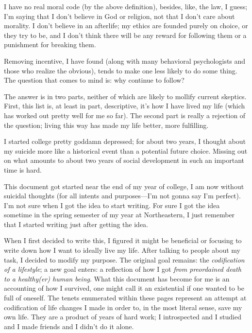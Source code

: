 \documentclass[./butidigress.tex]{subfiles}
\begin{document}
I have no real moral code (by the above definition), besides, like, the law, I guess; I'm saying that I don't believe in God or religion, not that I don't care about morality.
I don't believe in an afterlife; my ethics are founded purely on choice, or they try to be, and I don't think there will be any reward for following them or a punishment for breaking them.

Removing incentive, I have found (along with many behavioral psychologists and those who realize the obvious), tends to make one less likely to do some thing.
The question that comes to mind is: why continue to follow?

The answer is in two parts, neither of which are likely to mollify current skeptics.
First, this list is, at least in part, descriptive, it's how I have lived my life (which has worked out pretty well for me so far).
The second part is really a rejection of the question; living this way has made my life better, more fulfilling.

\label{sec:development}
I started college pretty goddamn depressed; for about two years, I thought about my suicide more like a historical event than a potential future choice.
Missing out on what amounts to about two years of social development in such an important time is hard.

This document got started near the end of my  year of college, I am now without suicidal thoughts (for all intents and purposes---I'm not gonna say I'm perfect).
I'm not sure when I got the idea to start writing.
For sure I got the idea sometime in the spring semester of my  year at Northeastern, I just remember that I started writing just after getting the idea.

When I first decided to write this, I figured it might be beneficial or focusing to write down how I want to ideally live my life.
After talking to people about my task, I decided to modify my purpose.
The original goal remains: the \emph{codification of a lifestyle}; a new goal enters: a reflection of how I got \emph{from preordained death to a healthy(er) human being}.
What this document has become for me is an accounting of how I survived, one might call it an existential  if one wanted to be full of oneself.
The tenets enumerated within these pages represent an attempt at codification of life changes I made in order to, in the most literal sense, save my own life.
They are a product of years of hard work; I introspected and I studied and I made friends and I didn't do it alone.
\end{document}
